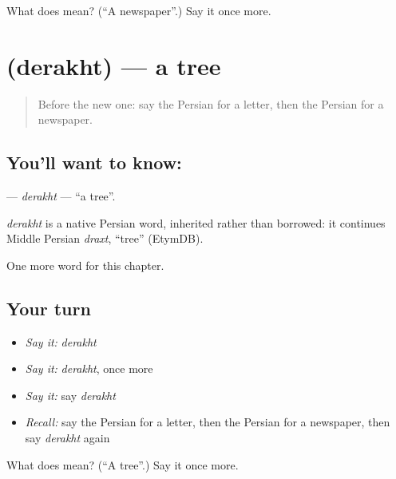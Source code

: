\begin{tcolorbox}[breakable,colback=teal!4,colframe=teal!35!black,title={Before you move on}]
What does  mean? (\textquotedblleft{}A newspaper\textquotedblright{}.) Say it once more.
\end{tcolorbox}
\section[\texorpdfstring{\fa{درخت} (derakht)}{درخت (derakht)}]{ (derakht) — a tree}

\label{lesson:FA-C51-derakht}



\begin{quote}
Before the new one: say the Persian for a letter, then the Persian for a newspaper.
\end{quote}

\subsection*{You'll want to know: }
\textbf{} — \emph{derakht} — \textquotedblleft{}a tree\textquotedblright{}.

\begin{cousinweb}
\emph{derakht} is a native Persian word, inherited rather than borrowed: it continues Middle Persian \emph{draxt}, \textquotedblleft{}tree\textquotedblright{} (EtymDB).
\end{cousinweb}

\begin{grammarlens}[title={What you've built}]
One more word for this chapter.
\end{grammarlens}

\subsection*{Your turn}
\begin{itemize}
\raggedright
  \item \emph{Say it:} \emph{derakht}
  \item \emph{Say it:} \emph{derakht}, once more
  \item \emph{Say it:} say \emph{derakht}
  \item \emph{Recall:} say the Persian for a letter, then the Persian for a newspaper, then say \emph{derakht} again
\end{itemize}

\begin{tcolorbox}[breakable,colback=teal!4,colframe=teal!35!black,title={Before you move on}]
What does  mean? (\textquotedblleft{}A tree\textquotedblright{}.) Say it once more.
\end{tcolorbox}
